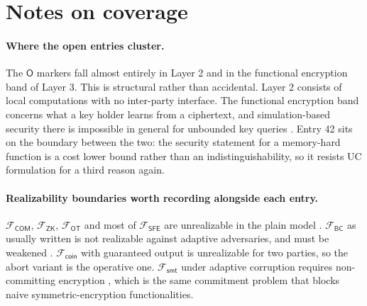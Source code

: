 \documentclass[11pt,a4paper]{article}
\newcommand{\Func}[1]{\ensuremath{\mathcal{F}_{\mathsf{#1}}}}
\newcommand{\StO}{\ensuremath{\mathsf{O}}}   %
\begin{document}
\section{Notes on coverage}

\paragraph{Where the open entries cluster.}
The \StO{} markers fall almost entirely in Layer 2 and in the functional
encryption band of Layer 3. This is structural rather than accidental. Layer 2
consists of local computations with no inter-party interface. The functional
encryption band concerns what a key holder learns from a ciphertext, and
simulation-based security there is impossible in general for unbounded key
queries \cite{bsw11}. Entry 42 sits on the boundary between the two: the
security statement for a memory-hard function is a cost lower bound rather
than an indistinguishability, so it resists UC formulation for a third reason
again.

\paragraph{Realizability boundaries worth recording alongside each entry.}
\Func{COM}, \Func{ZK}, \Func{OT} and most of \Func{SFE} are unrealizable in
the plain model \cite{cf01,ckl06}. \Func{BC} as usually written is not
realizable against adaptive adversaries, and must be weakened
\cite{hz10,gkkz11}. \Func{coin} with guaranteed output is unrealizable for two
parties, so the abort variant is the operative one. \Func{smt} under adaptive
corruption requires non-committing encryption \cite{cfgn96}, which is the same
commitment problem that blocks naive symmetric-encryption functionalities.
\end{document}
